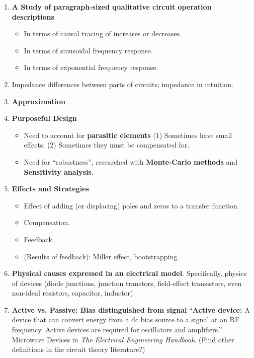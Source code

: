 \documentclass{article}
\begin{document}
\begin{enumerate}
\item
\textbf{A Study of paragraph-sized qualitative circuit operation descriptions}
\begin{itemize}
\item In terms of causal tracing of increases or decreases.
\item In terms of sinusoidal frequency response.
\item In terms of exponential frequency response.
\end{itemize}

\item 
Impedance differences between parts of circuits; impedance in intuition.

\item
\textbf{Approximation}

\item
\textbf{Purposeful Design}

\begin{itemize}
\item Need to account for 
\textbf{parasitic elements}
(1) Sometimes have small effects.
(2) Sometimes they must be compensated for.
\item Need for ``robustness'', researched with 
\textbf{Monte-Carlo methods} and
\textbf{Sensitivity analysis}. \cite{HiFreqChaosMakerEE}
\end{itemize}

\item
\textbf{Effects and Strategies}
\begin{itemize}
\item Effect of adding (or displacing) poles and zeros to a transfer function.
\item Compensation.
\item Feedback.
\item (Results of feedback): Miller effect, bootstrapping.
\end{itemize}

\item
\textbf{Physical causes expressed in an electrical model}.  Specifically, 
physics of devices (diode junctions, junction transtors, 
field-effect transistors, even non-ideal resistors, capacitor, inductor).

\item
\textbf{Active vs. Passive: Bias distinguished from signal}
``\textbf{Active device:} A device that can convert energy from a dc bias
source to a signal at an RF frequency.  Active devices are required for
oscillators and amplifiers.'' Microwave Devices in 
\textit{The Electrical Engineering 
Handbook}.\cite[ch.37, Streer and Trew]{EEHandbook}
(Find other 
definitions in the circuit theory literature?)


\end{enumerate}
\end{document}
